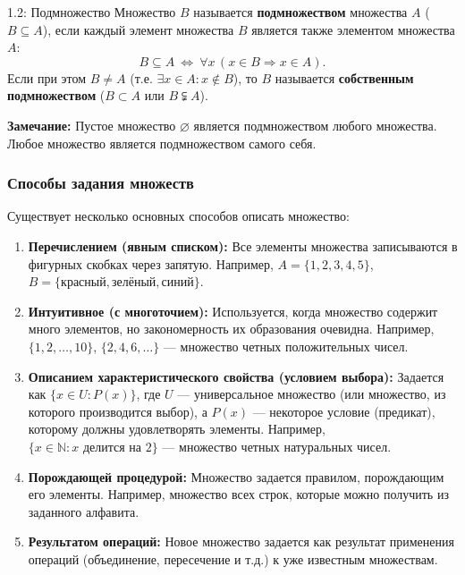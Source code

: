 \documentclass[a4paper,12pt]{article}
\begin{document}
\begin{definitionbox}{1.2: Подмножество}
	Множество $B$ называется \textbf{подмножеством} множества $A$ ($B \subseteq A$), если каждый элемент множества $B$ является также элементом множества $A$:
	\[
	B \subseteq A \ \Longleftrightarrow\ \forall x \, (x \in B \Rightarrow x \in A).
	\]
	Если при этом $B \neq A$ (т.е. $\exists x \in A : x \notin B$), то $B$ называется \textbf{собственным подмножеством} ($B \subset A$ или $B \subsetneqq A$).
	
	\textbf{Замечание:} Пустое множество $\varnothing$ является подмножеством любого множества. Любое множество является подмножеством самого себя.
\end{definitionbox}

\begin{center}
\end{center}

\subsubsection{Способы задания множеств}
Существует несколько основных способов описать множество:
\begin{enumerate}
	\item \textbf{Перечислением (явным списком):} Все элементы множества записываются в фигурных скобках через запятую. Например, $A = \{1, 2, 3, 4, 5\}$, $B = \{\text{красный}, \text{зелёный}, \text{синий}\}$.
	\item \textbf{Интуитивное (с многоточием):} Используется, когда множество содержит много элементов, но закономерность их образования очевидна. Например, $\{1, 2, \dots, 10\}$, $\{2, 4, 6, \dots\}$ — множество четных положительных чисел.
	\item \textbf{Описанием характеристического свойства (условием выбора):} Задается как $\{x \in U : P(x)\}$, где $U$ — универсальное множество (или множество, из которого производится выбор), а $P(x)$ — некоторое условие (предикат), которому должны удовлетворять элементы. Например, $\{x \in \mathbb{N} : x \text{ делится на } 2\}$ — множество четных натуральных чисел.
	\item \textbf{Порождающей процедурой:} Множество задается правилом, порождающим его элементы. Например, множество всех строк, которые можно получить из заданного алфавита.
	\item \textbf{Результатом операций:} Новое множество задается как результат применения операций (объединение, пересечение и т.д.) к уже известным множествам.
\end{enumerate}
\end{document}
